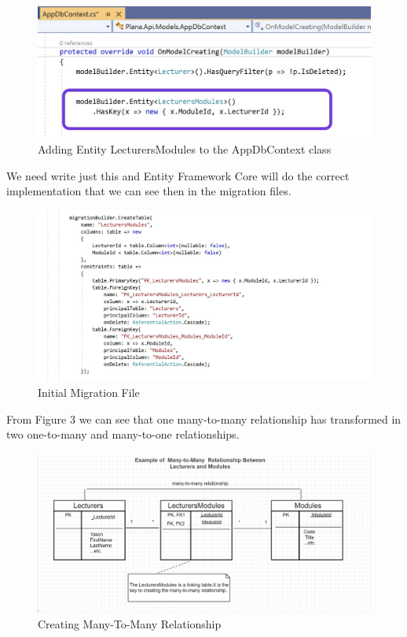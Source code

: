 \documentclass{scrartcl}
\begin{document}
\begin{figure}[H]
\centering
\includegraphics[width=150mm]{report_img/many-to-many.JPG}
\caption{Adding Entity LecturersModules to the AppDbContext class}
\label{blabla}
\end{figure}  
We need write just this and Entity Framework Core will do the correct implementation that we can see then in the migration files. \cite{patrick}

\begin{figure}[H]
\centering
\includegraphics[width=150mm]{report_img/Initial.JPG}
\caption{Initial Migration File}
\label{blabla}
\end{figure} 

From Figure 3 we can see that one many-to-many relationship has transformed in two one-to-many and many-to-one relationships.

\begin{figure}[H]
\centering
\includegraphics[width=150mm]{report_img/many-to-many-tables.JPG}
\caption{Creating Many-To-Many Relationship}
\label{blabla}
\end{figure}
\end{document}
